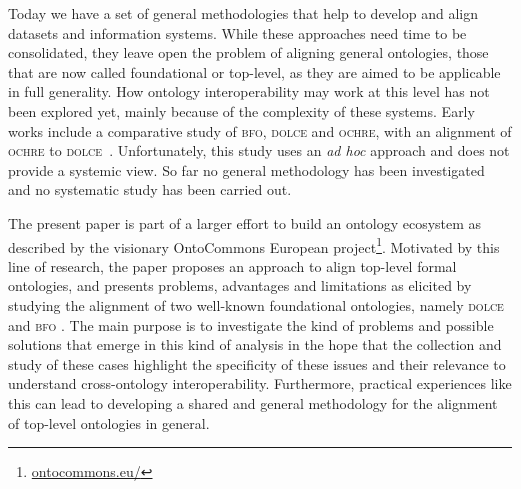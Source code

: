 \documentclass[ao]{iosart2x}
\newcommand{\nb}[1]{\textcolor{red}{$|$}\marginpar{\hspace*{-0cm}\parbox{20mm}{\scriptsize\raggedright\textcolor{red}{#1}}}}
\newcommand{\dolce}{{\textsc{dolce}}}
\newcommand{\bfo}{{\textsc{bfo}}}
\begin{document}
Today we have a set of general methodologies \citep{Euzenat2013, Jarrar2009, fernandezMethontology1997, gomezNeon2009} that help to develop and align datasets and information systems. While these approaches need time to be consolidated, they leave open the problem of aligning general ontologies, those that are now called foundational or top-level, as they are aimed to be applicable in full generality. 
How ontology interoperability may work at this level has not been explored yet, mainly because of the complexity of these systems. Early works include a comparative study of {\bfo}, {\dolce} and \textsc{ochre}, with an alignment of \textsc{ochre} to {\dolce}~\citep{D18}. 
Unfortunately, this study uses an \textit{ad hoc} approach and does not provide a systemic view. So far no general methodology has been investigated and no systematic study has been carried out.

\medskip
The present paper is part of a larger effort to build an ontology ecosystem as described by the visionary OntoCommons European project\footnote{\url{ontocommons.eu/}}. Motivated by this line of research, the paper proposes an approach to align top-level formal ontologies, and presents problems, advantages and limitations as elicited by studying the alignment of two well-known foundational ontologies, namely {\dolce} \citep{borgoDOLCEDescriptiveOntology2022} and {\bfo} \citep{barryBasicFormalOntology2015}. The main purpose is to investigate the kind of problems and possible solutions that emerge in this kind of analysis in the hope that the collection and study of these cases highlight the specificity of these issues and their relevance to understand cross-ontology interoperability. Furthermore, practical experiences like this can lead to developing a shared and general methodology for the alignment of top-level ontologies in general.
\end{document}
